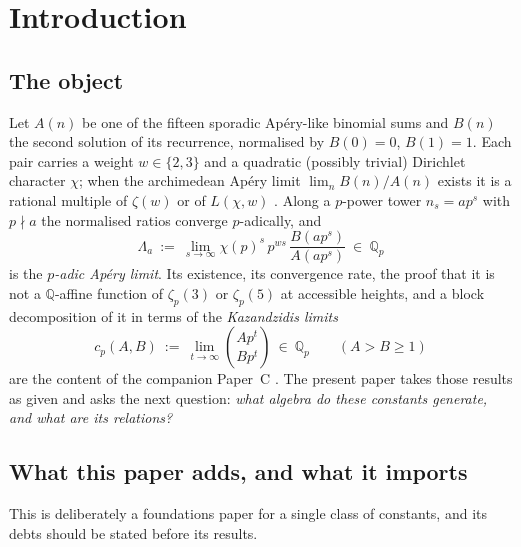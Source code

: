 \documentclass[11pt,reqno]{article}
\newcommand{\Qp}{\mathbb{Q}_p}
\newcommand{\QQ}{\mathbb{Q}}
\newcommand{\bin}[2]{\binom{#1}{#2}}
\theoremstyle{plain}
\theoremstyle{definition}
\theoremstyle{remark}
\numberwithin{equation}{section}
\begin{document}
\tableofcontents

\section{Introduction}\label{sec:intro}

\subsection{The object}\label{ss:object}

Let $A(n)$ be one of the fifteen sporadic Ap\'ery-like binomial sums
\cite{Zagier2009,Cooper2012,MalikStraub,Straub2023} and $B(n)$ the second
solution of its recurrence, normalised by $B(0)=0$, $B(1)=1$.  Each pair carries
a weight $w\in\{2,3\}$ and a quadratic (possibly trivial) Dirichlet character
$\chi$; when the archimedean Ap\'ery limit $\lim_nB(n)/A(n)$ exists it is a
rational multiple of $\zeta(w)$ or of $L(\chi,w)$
\cite{ASvSZ2008,ChamberlandStraub,PaperA}.  Along a $p$-power tower $n_s=ap^s$
with $p\nmid a$ the normalised ratios converge $p$-adically, and
\begin{equation}\label{eq:Lam}
  \Lambda_a\ :=\ \lim_{s\to\infty}\chi(p)^{s}\,p^{ws}\,\frac{B(ap^s)}{A(ap^s)}\ \in\ \Qp
\end{equation}
is the \emph{$p$-adic Ap\'ery limit}.  Its existence, its convergence rate, the
proof that it is not a $\QQ$-affine function of $\zeta_p(3)$ or $\zeta_p(5)$ at
accessible heights, and a block decomposition of it in terms of the
\emph{Kazandzidis limits}
\begin{equation}\label{eq:cp}
  c_p(A,B)\ :=\ \lim_{t\to\infty}\bin{Ap^t}{Bp^t}\ \in\ \Qp
  \qquad(A>B\ge1)
\end{equation}
are the content of the companion Paper~C \cite{PaperC}.  The present paper takes
those results as given and asks the next question: \emph{what algebra do these
constants generate, and what are its relations?}

\subsection{What this paper adds, and what it imports}\label{ss:position}

This is deliberately a foundations paper for a single class of constants, and
its debts should be stated before its results.
\end{document}
